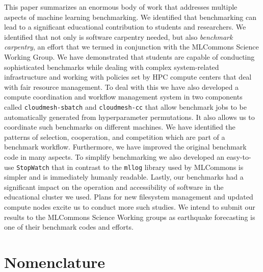 \documentclass[utf8]{FrontiersinVancouver} %
\newcommand{\TODO}[2]{\todo[inline]{{\bf \color{red} #1} #2}}
\begin{document}
This paper summarizes an enormous body of work that addresses multiple
aspects of machine learning benchmarking. We identified that
benchmarking can lead to a significant educational contribution to
students and researchers. We identified that not only is software
carpentry needed, but also {\em benchmark carpentry}, an effort that
we termed in conjunction with the MLCommons Science Working Group. We
have demonstrated that students are capable of conducting
sophisticated benchmarks while dealing with complex system-related
infrastructure and working with policies set by HPC compute centers
that deal with fair resource management. To deal with this we have
also developed a compute coordination and workflow management system
in two components called \verb|cloudmesh-sbatch| and
\verb|cloudmesh-cc| that allow benchmark jobs to be automatically
generated from hyperparameter permutations. It also allows us to
coordinate such benchmarks on different machines. We have identified
the patterns of selection, cooperation, and competition which are part
of a benchmark workflow. Furthermore, we have improved the original
benchmark code in many aspects. To simplify benchmarking we also
developed an easy-to-use \verb|StopWatch| that in contrast to the
\verb|mllog| library used by MLCommons is simpler and is immediately
humanly readable. Lastly, our benchmarks had a significant impact on
the operation and accessibility of software in the educational cluster
we used. Plans for new filesystem management and updated compute nodes
excite us to conduct more such studies. We intend to submit our
results to the MLCommons Science Working groups as earthquake
forecasting is one of their benchmark codes and efforts.

\clearpage

\section{Nomenclature}
\end{document}
